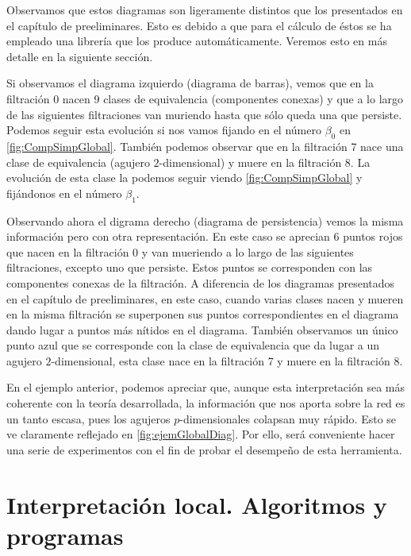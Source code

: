 \documentclass[12pt, a4paper, twoside]{book}
\numberwithin{equation}{section}
\theoremstyle{definition}
\newenvironment{ejem}
  {\pushQED{\qed}\renewcommand{\qedsymbol}{$\blacktriangleleft$}\ejemplo}
  {\popQED\endejemplo}
\theoremstyle{remark}
\theoremstyle{plain}
\begin{document}
\begin{ejem}
	Observamos que estos diagramas son ligeramente distintos que los 
	presentados en el capítulo de preeliminares. Esto es debido a que para
	el cálculo de éstos se ha empleado una librería que los produce 
	automáticamente. Veremos esto en más detalle en la siguiente sección.

	Si observamos el diagrama izquierdo (diagrama de barras), vemos que en 
	la filtración 0 nacen 9 clases de equivalencia (componentes conexas) y
	que a lo largo de las siguientes filtraciones van muriendo hasta que 
	sólo queda una que persiste. Podemos seguir esta evolución si nos 
	vamos fijando en el número $\beta_{0}$ en  
	\autoref{fig:CompSimpGlobal}. También podemos observar que en la 
	filtración 7 nace una clase de equivalencia (agujero $2$-dimensional) 
	y muere en la filtración 8. La evolución de esta clase la podemos 
	seguir viendo \autoref{fig:CompSimpGlobal} y fijándonos en el 
	número $\beta_{1}$.

	Observando ahora el digrama derecho (diagrama de persistencia) vemos 
	la misma información pero con otra representación. En este caso se 
	aprecian 6 puntos rojos que nacen en la filtración 0 y van mueriendo a 
	lo largo de las siguientes filtraciones, excepto uno que persiste. 
	Estos puntos se corresponden 
	con las componentes conexas de la filtración. A diferencia de los 
	diagramas presentados en el capítulo de preeliminares, en este caso, 
	cuando varias clases nacen y mueren en la misma filtración se 
	superponen sus puntos correspondientes en el diagrama dando lugar a 
	puntos más nítidos en el diagrama. También observamos un único punto 
	azul que se corresponde con la clase de equivalencia que da lugar a un
	agujero $2$-dimensional, esta clase nace en la filtración 7 y muere en
	la filtración 8.

	\end{ejem}

	En el ejemplo anterior, podemos apreciar que, aunque esta 
	interpretación sea más coherente con la teoría desarrollada, la 
	información que nos aporta sobre la red es un tanto escasa, pues los 
	agujeros $p$-dimensionales colapsan muy rápido. Esto se ve claramente 
	reflejado en \autoref{fig:ejemGlobalDiag}. Por ello, 
	será conveniente hacer una serie de experimentos con el fin de probar
	el desempeño de esta herramienta.

	\section{Interpretación local. Algoritmos y programas}
\end{document}
